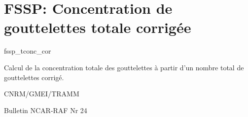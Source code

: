 %
\section{FSSP: Concentration de gouttelettes totale corrig\'ee }

 {\sf fssp\_tconc\_cor}

Calcul de la concentration totale des gouttelettes \`a partir
d'un nombre total de gouttelettes corrig\'e. 

\bigskip





CNRM/GMEI/TRAMM

Bulletin NCAR-RAF Nr 24 \cite{RAF-24}
